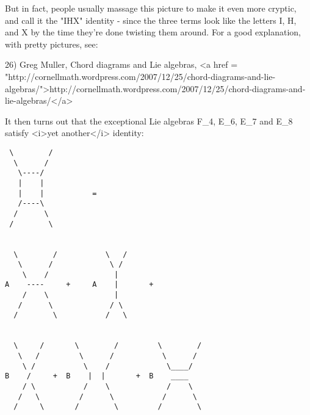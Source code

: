But in fact, people usually massage this picture to make it even
more cryptic, and call it the "IHX" identity - since the three terms
look like the letters I, H, and X by the time they're done twisting
them around.  For a good explanation, with pretty pictures, see:

26) Greg Muller, Chord diagrams and Lie algebras, 
<a href = "http://cornellmath.wordpress.com/2007/12/25/chord-diagrams-and-lie-algebras/">http://cornellmath.wordpress.com/2007/12/25/chord-diagrams-and-lie-algebras/</a>
 
It then turns out that the exceptional Lie algebras 
F_{4}, E_{6}, E_{7} and E_{8} satisfy 
<i>yet another</i> identity:

\begin{verbatim}
 \        /                
  \      /                
   \----/                
   |    |                       
   |    |           = 
   /----\            
  /      \          
 /        \                
                       
 
  \        /           \   /
   \      /             \ /   
    \    /               |   
A    ----     +     A    |       +
    /    \               |  
   /      \             / \  
  /        \           /   \  


  \     /       \        /         \        /
   \   /         \      /           \      /
    \ /           \    /             \____/ 
B    /     +  B    |  |       +  B    ____    
    / \           /    \             /    \
   /   \         /      \           /      \
  /     \       /        \         /        \
\end{verbatim}
    




